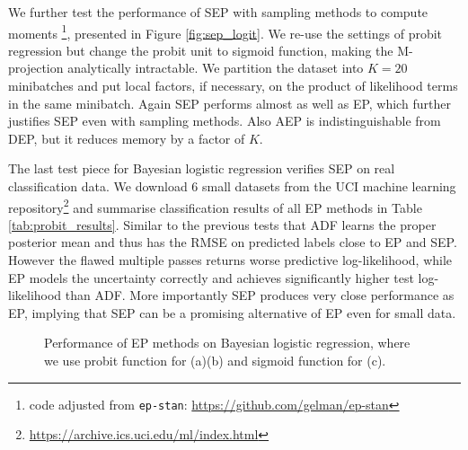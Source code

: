 We further test the performance of SEP with sampling methods to compute moments \footnote{code adjusted from \texttt{ep-stan}: \url{https://github.com/gelman/ep-stan}}, presented in Figure \ref{fig:sep_logit}. We re-use the settings of probit regression but change the probit unit to sigmoid function, making the M-projection analytically intractable. We partition the dataset into $K = 20$ minibatches and put local factors, if necessary, on the product of likelihood terms in the same minibatch. Again SEP performs almost as well as EP, which further justifies SEP even with sampling methods. Also AEP is indistinguishable from DEP, but it reduces memory by a factor of $K$.

The last test piece for Bayesian logistic regression verifies SEP on real classification data. We download 6 small datasets from the UCI machine learning repository\footnote{\url{https://archive.ics.uci.edu/ml/index.html}} and summarise classification results of all EP methods in Table \ref{tab:probit_results}. Similar to the previous tests that ADF learns the proper posterior mean and thus has the RMSE on predicted labels close to EP and SEP. However the flawed multiple passes returns worse predictive log-likelihood, while EP models the uncertainty correctly and achieves significantly higher test log-likelihood than ADF. More importantly SEP produces very close performance as EP, implying that SEP can be a promising alternative of EP even for small data.

\begin{figure}
\centering
\def\svgwidth{0.3\linewidth}
\subfigure[\label{fig:sep_probit}]{
}
%
%
\def\svgwidth{0.3\linewidth}
\subfigure[\label{fig:daep_probit}]{
}
%
%
\def\svgwidth{0.3\linewidth}
\subfigure[\label{fig:sep_logit}]{
}
%
\caption{Performance of EP methods on Bayesian logistic regression, where we use probit function for (a)(b) and sigmoid function for (c).}
\end{figure}

